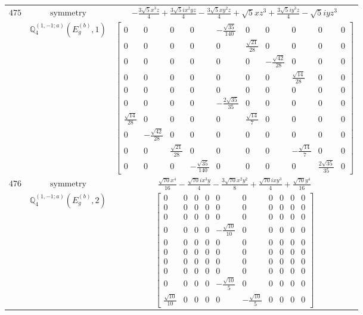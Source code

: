 \documentclass[fleqn,8pt,landscape]{jsarticle}
\begin{document}
\begin{longtable}{ccc}
$ 475 $ & $ \text{symmetry} $ & $ - \frac{3 \sqrt{5} x^{3} z}{4} + \frac{3 \sqrt{5} i x^{2} y z}{4} - \frac{3 \sqrt{5} x y^{2} z}{4} + \sqrt{5} x z^{3} + \frac{3 \sqrt{5} i y^{3} z}{4} - \sqrt{5} i y z^{3} $ \\
$  $ & $ \mathbb{Q}_{4}^{(1,-1;a)}(E_{g}^{(b)},1) $ & $ \begin{bmatrix} 0 & 0 & 0 & 0 & - \frac{\sqrt{35}}{140} & 0 & 0 & 0 & 0 & 0 \\ 0 & 0 & 0 & 0 & 0 & \frac{\sqrt{21}}{28} & 0 & 0 & 0 & 0 \\ 0 & 0 & 0 & 0 & 0 & 0 & - \frac{\sqrt{42}}{28} & 0 & 0 & 0 \\ 0 & 0 & 0 & 0 & 0 & 0 & 0 & \frac{\sqrt{14}}{28} & 0 & 0 \\ 0 & 0 & 0 & 0 & 0 & 0 & 0 & 0 & 0 & 0 \\ 0 & 0 & 0 & 0 & - \frac{2 \sqrt{35}}{35} & 0 & 0 & 0 & 0 & 0 \\ \frac{\sqrt{14}}{28} & 0 & 0 & 0 & 0 & \frac{\sqrt{14}}{7} & 0 & 0 & 0 & 0 \\ 0 & - \frac{\sqrt{42}}{28} & 0 & 0 & 0 & 0 & 0 & 0 & 0 & 0 \\ 0 & 0 & \frac{\sqrt{21}}{28} & 0 & 0 & 0 & 0 & - \frac{\sqrt{14}}{7} & 0 & 0 \\ 0 & 0 & 0 & - \frac{\sqrt{35}}{140} & 0 & 0 & 0 & 0 & \frac{2 \sqrt{35}}{35} & 0 \end{bmatrix} $ \\ \hline
$ 476 $ & $ \text{symmetry} $ & $ \frac{\sqrt{70} x^{4}}{16} - \frac{\sqrt{70} i x^{3} y}{4} - \frac{3 \sqrt{70} x^{2} y^{2}}{8} + \frac{\sqrt{70} i x y^{3}}{4} + \frac{\sqrt{70} y^{4}}{16} $ \\
$  $ & $ \mathbb{Q}_{4}^{(1,-1;a)}(E_{g}^{(b)},2) $ & $ \begin{bmatrix} 0 & 0 & 0 & 0 & 0 & 0 & 0 & 0 & 0 & 0 \\ 0 & 0 & 0 & 0 & 0 & 0 & 0 & 0 & 0 & 0 \\ 0 & 0 & 0 & 0 & 0 & 0 & 0 & 0 & 0 & 0 \\ 0 & 0 & 0 & 0 & - \frac{\sqrt{10}}{10} & 0 & 0 & 0 & 0 & 0 \\ 0 & 0 & 0 & 0 & 0 & 0 & 0 & 0 & 0 & 0 \\ 0 & 0 & 0 & 0 & 0 & 0 & 0 & 0 & 0 & 0 \\ 0 & 0 & 0 & 0 & 0 & 0 & 0 & 0 & 0 & 0 \\ 0 & 0 & 0 & 0 & 0 & 0 & 0 & 0 & 0 & 0 \\ 0 & 0 & 0 & 0 & - \frac{\sqrt{10}}{5} & 0 & 0 & 0 & 0 & 0 \\ \frac{\sqrt{10}}{10} & 0 & 0 & 0 & 0 & - \frac{\sqrt{10}}{5} & 0 & 0 & 0 & 0 \end{bmatrix} $ \\ \hline

\end{longtable}
\end{document}
